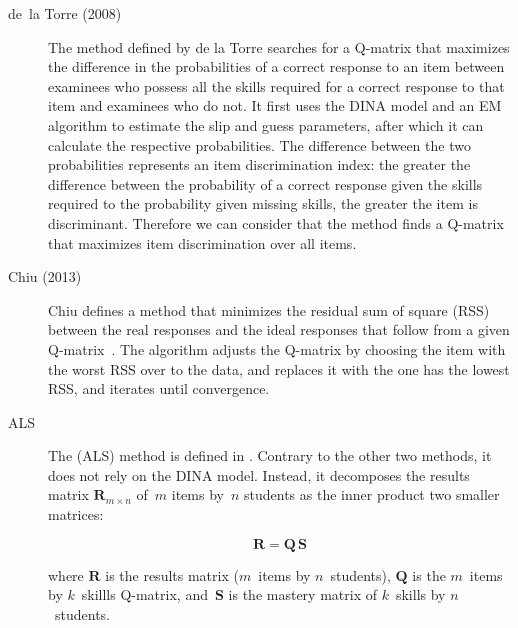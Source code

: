 \begin{description}


\item[de~la Torre (2008)] The method defined by de la Torre \citep{delaTorre2008} searches for a Q-matrix that maximizes the difference in the probabilities of a correct response to an item between examinees who possess all the skills required for a correct response to that item and examinees who do not. It first uses the DINA model and an EM algorithm to estimate the slip and guess parameters, after which it can calculate the respective probabilities.  The difference between the two probabilities represents an item discrimination index: the greater the difference between the probability of a correct response given the skills required to the probability given missing skills, the greater the item is discriminant. Therefore we can consider that the method finds a Q-matrix that maximizes item discrimination over all items.


\item[Chiu (2013)] Chiu defines a method that minimizes the residual sum of square (RSS) between the real responses and the ideal responses that follow from a given Q-matrix~\citep{chiu2013statistical}.  The algorithm adjusts the Q-matrix by choosing the item with the worst RSS over to the data, and replaces it with the one has the lowest RSS, and iterates until convergence.

\item[ALS] The  (ALS) method is defined in \citep{Desmarais2013aied}.  Contrary to the other two methods, it does not rely on the DINA model.  Instead, it decomposes the results matrix $\mathbf{R}_{m \times n}$ of~$m$ items by~$n$ students as the inner product two smaller matrices:

\begin{equation}
  \mathbf{{R}} = \mathbf{Q} \, \mathbf{S} \label{eq:nmf}
\end{equation}

where $\mathbf{R}$ is the results matrix ($m$~items by $n$~students),  $\mathbf{Q}$ is the $m$~items by $k$~skillls Q-matrix, and~$\mathbf{S}$ is the mastery matrix of $k$~skills by $n$~students.

\end{description}
